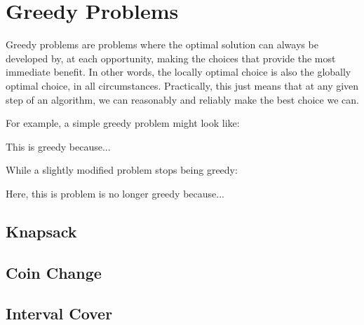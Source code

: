 \section{Greedy Problems}

Greedy problems are problems where the optimal solution can always be developed by, at each opportunity, making the choices that provide the most immediate benefit. In other words, the locally optimal choice is also the globally optimal choice, in all circumstances. Practically, this just means that at any given step of an algorithm, we can reasonably and reliably make the best choice we can.

For example, a simple greedy problem might look like:

This is greedy because...

While a slightly modified problem stops being greedy:

Here, this is problem is no longer greedy because...

\subsection{Knapsack}

\subsection{Coin Change}

\subsection{Interval Cover}